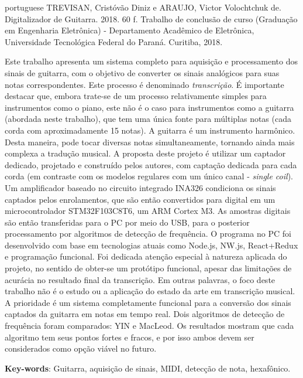 \begin{summary}[Resumo]
	\begin{otherlanguage*}{portuguese}
		TREVISAN, Cristóvão Diniz e ARAUJO, Victor Volochtchuk de. Digitalizador de Guitarra.
		2018. 60 f. Trabalho de conclusão de curso (Graduação em Engenharia Eletrônica) -
		Departamento Acadêmico de Eletrônica, Universidade Tecnológica Federal do Paraná.
		Curitiba, 2018.


		Este trabalho apresenta um sistema completo para aquisição e processamento dos sinais de guitarra,
		com o objetivo de converter os sinais analógicos para suas notas correspondentes. Este processo é denominado \emph{transcrição}.
		É importante destacar que, embora trate-se de um processo relativamente simples para instrumentos
		como o piano, este não é o caso para instrumentos como a guitarra (abordada neste trabalho), que tem
		uma única fonte para múltiplas notas (cada corda com aproximadamente 15 notas). A guitarra é um instrumento
		harmônico. Desta maneira, pode tocar diversas notas simultaneamente, tornando ainda mais complexa a tradução
		musical. A proposta deste projeto é utilizar um captador dedicado, projetado e construído pelos autores,
		com captação dedicada para cada corda (em contraste com os modelos regulares com um único canal - \emph{single coil}).
		Um amplificador baseado no circuito integrado INA326 condiciona os sinais captados pelos enrolamentos, que são
		então convertidos para digital em um microcontrolador STM32F103C8T6,
		um ARM Cortex M3. As amostras digitais são então transferidas para o PC por meio do USB, para o posterior processamento
		por algoritmos de detecção de frequência.  O programa no PC foi desenvolvido com base em tecnologias atuais como Node.js, NW.js, React+Redux e
		programação funcional. Foi dedicada atenção especial à natureza aplicada do projeto, no sentido de obter-se
		um protótipo funcional, apesar das limitações de acurácia no resultado final da transcrição. Em outras palavras,
		o foco deste trabalho não é o estudo ou a aplicação do estado da arte em transcrição musical. A prioridade é um sistema completamente funcional
		para a conversão dos sinais captados da guitarra em notas em tempo real. Dois algoritmos de detecção
		de frequência foram comparados: YIN e MacLeod. Os resultados mostram que cada algoritmo tem seus pontos
		fortes e fracos, e por isso ambos devem ser considerados como opção viável no futuro.


		\textbf{Key-words}: Guitarra, aquisição de sinais, MIDI, detecção de nota, hexafônico.
	\end{otherlanguage*}
\end{summary}

